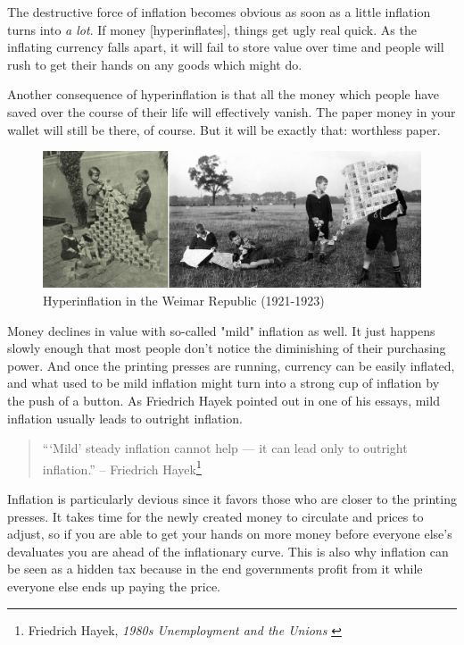 The destructive force of inflation becomes obvious as soon as a little
inflation turns into \textit{a lot}. If money [hyperinflates], things get ugly
real quick. As the inflating currency falls apart, it will fail to store
value over time and people will rush to get their hands on any goods
which might do.

Another consequence of hyperinflation is that all the money which people
have saved over the course of their life will effectively vanish. The
paper money in your wallet will still be there, of course. But it will
be exactly that: worthless paper.

\begin{figure}
  \includegraphics{assets/images/children-playing-with-money.png}
  \caption{Hyperinflation in the Weimar Republic (1921-1923)}
  \label{fig:children-playing-with-money}
\end{figure}

Money declines in value with so-called "mild" inflation as well. It
just happens slowly enough that most people don't notice the diminishing
of their purchasing power. And once the printing presses are running,
currency can be easily inflated, and what used to be mild inflation
might turn into a strong cup of inflation by the push of a button. As
Friedrich Hayek pointed out in one of his essays, mild inflation usually
leads to outright inflation.

\begin{quotation}
```Mild' steady inflation cannot help --- it can lead only to outright
inflation.''
\flushright -- Friedrich Hayek\footnote{Friedrich Hayek, \textit{1980s
Unemployment and the Unions} \cite{hayek-inflation}}
\end{quotation}

Inflation is particularly devious since it favors those who are closer
to the printing presses. It takes time for the newly created money to
circulate and prices to adjust, so if you are able to get your hands on
more money before everyone else's devaluates you are ahead of the
inflationary curve. This is also why inflation can be seen as a hidden
tax because in the end governments profit from it while everyone else
ends up paying the price.

